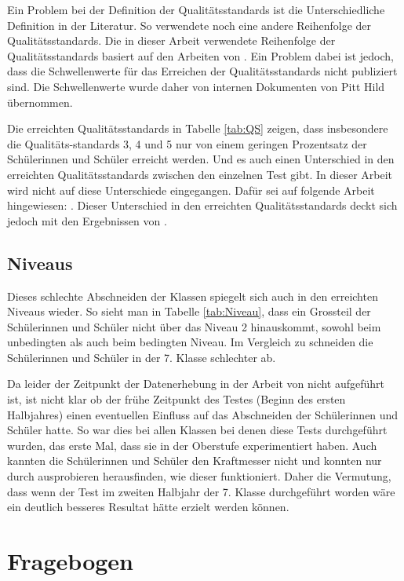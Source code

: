 Ein Problem bei der Definition der Qualitätsstandards ist die Unterschiedliche Definition in der Literatur. So verwendete \citet{Gut2013a} noch eine andere Reihenfolge der Qualitätsstandards. Die in dieser Arbeit verwendete Reihenfolge der Qualitätsstandards basiert auf den Arbeiten von \citet{Metzger2013, Gut2013a}. Ein Problem dabei ist jedoch, dass die Schwellenwerte für das Erreichen der Qualitätsstandards nicht publiziert sind. Die Schwellenwerte wurde daher von internen Dokumenten von Pitt Hild übernommen.

Die erreichten Qualitätsstandards in Tabelle \ref{tab:QS} zeigen, dass insbesondere die Qualitäts-standards 3, 4 und 5 nur von einem geringen Prozentsatz der Schülerinnen und Schüler erreicht werden. Und es auch einen Unterschied in den erreichten Qualitätsstandards zwischen den einzelnen Test gibt. In dieser Arbeit wird nicht auf diese Unterschiede eingegangen. Dafür sei auf folgende Arbeit hingewiesen: \citet{Sichau2015}. Dieser Unterschied in den erreichten Qualitätsstandards deckt sich jedoch mit den Ergebnissen von \citet{Metzger2013}.

\subsection{Niveaus}

Dieses schlechte Abschneiden der Klassen spiegelt sich auch in den erreichten Niveaus wieder. So sieht man in Tabelle \ref{tab:Niveau}, dass ein Grossteil der Schülerinnen und Schüler nicht über das Niveau 2 hinauskommt, sowohl beim unbedingten als auch beim bedingten Niveau. Im Vergleich zu \citet{Metzger2013} schneiden die Schülerinnen und Schüler in der 7. Klasse schlechter ab. 

Da leider der Zeitpunkt der Datenerhebung in der Arbeit von \citet{Metzger2013} nicht aufgeführt ist, ist nicht klar ob der frühe Zeitpunkt des Testes (Beginn des ersten Halbjahres) einen eventuellen Einfluss auf das Abschneiden der Schülerinnen und Schüler hatte. So war dies bei allen Klassen bei denen diese Tests durchgeführt wurden, das erste Mal, dass sie in der Oberstufe experimentiert haben. Auch kannten die Schülerinnen und Schüler den Kraftmesser nicht und konnten nur durch ausprobieren herausfinden, wie dieser funktioniert. Daher die Vermutung, dass wenn der Test im zweiten Halbjahr der 7. Klasse durchgeführt worden wäre ein deutlich besseres Resultat hätte erzielt werden können.



\section{Fragebogen}


